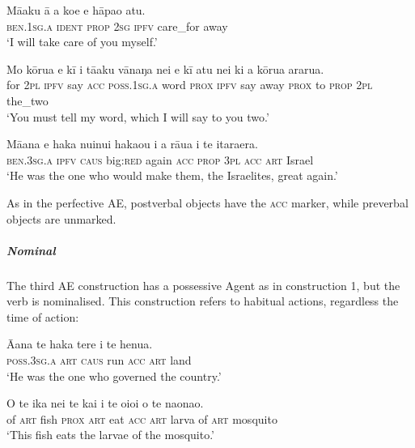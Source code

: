 \ea\label{ex:8.99}
\gll Mā{\ꞌ}aku {\ꞌ}ā a koe e hāpa{\ꞌ}o atu. \\
\textsc{ben.1sg.a} \textsc{ident} \textsc{prop} \textsc{2sg} \textsc{ipfv} care\_for away \\

\glt 
‘I will take care of you myself.’ \textstyleExampleref{[R310.067]} 
\z

\ea\label{ex:8.100}
\gll Mo kōrua e kī i tā{\ꞌ}aku vānaŋa nei e kī atu nei  ki a kōrua ararua.\\
for \textsc{2pl} \textsc{ipfv} say \textsc{acc} \textsc{poss.1sg.a} word \textsc{prox} \textsc{ipfv} say away \textsc{prox}  to \textsc{prop} \textsc{2pl} the\_two\\

\glt 
‘You must tell my word, which I will say to you two.’ \textstyleExampleref{[R229.275]} 
\z

\ea\label{ex:8.101}
\gll Mā{\ꞌ}ana e haka nuinui haka{\ꞌ}ou i a rāua i te itaraera. \\
\textsc{ben.3sg.a} \textsc{ipfv} \textsc{caus} big:\textsc{red} again \textsc{acc} \textsc{prop} \textsc{3pl} \textsc{acc} \textsc{art} Israel \\

\glt
‘He was the one who would make them, the Israelites, great again.’ 
\z

As in the perfective AE, postverbal objects have the \textsc{acc} marker, while preverbal objects are unmarked. 

\subparagraph{Nominal} The third AE construction has a possessive Agent as in construction 1, but the verb is nominalised. This construction refers to habitual actions, regardless the time of action:

\ea\label{ex:8.102}
\gll {\ꞌ}Ā{\ꞌ}ana te haka tere i te henua. \\
\textsc{poss.3sg.a} \textsc{art} \textsc{caus} run \textsc{acc} \textsc{art} land \\

\glt 
‘He was the one who governed the country.’ \textstyleExampleref{[R370.005]} 
\z

\ea\label{ex:8.103}
\gll O te ika nei te kai i te o{\ꞌ}io{\ꞌ}i o te naonao. \\
of \textsc{art} fish \textsc{prox} \textsc{art} eat \textsc{acc} \textsc{art} larva of \textsc{art} mosquito \\

\glt
‘This fish eats the larvae of the mosquito.’ \textstyleExampleref{[R535.110]} 
\z

